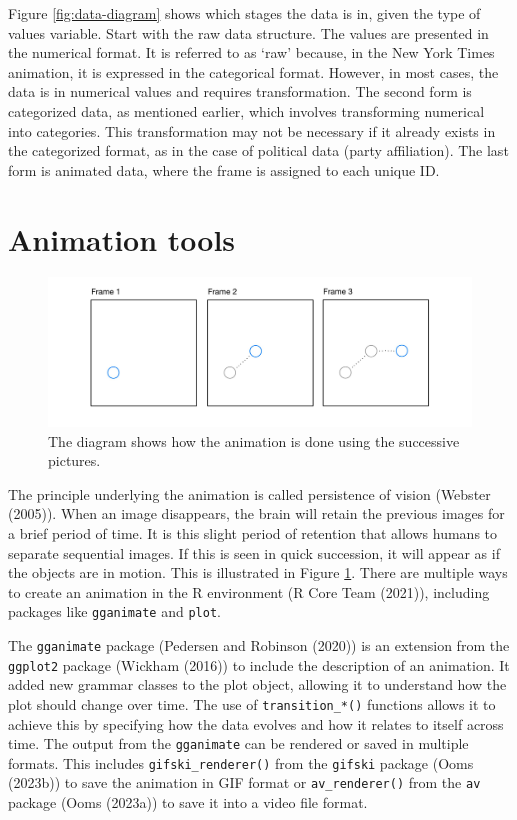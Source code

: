 Figure \ref{fig:data-diagram} shows which stages the data is in, given the type of values variable. Start with the raw data structure. The values are presented in the numerical format. It is referred to as `raw' because, in the New York Times animation, it is expressed in the categorical format. However, in most cases, the data is in numerical values and requires transformation. The second form is categorized data, as mentioned earlier, which involves transforming numerical into categories.
This transformation may not be necessary if it already exists in the categorized format, as in the case of political data (party affiliation). The last form is animated data, where the frame is assigned to each unique ID.

\hypertarget{animation-tools}{%
\section{Animation tools}\label{animation-tools}}

\begin{figure}

{\centering \includegraphics[width=1\linewidth]{figures/animation-diagram} 

}

\caption{The diagram shows how the animation is done using the successive pictures.}\label{fig:animation-diagram}
\end{figure}

The principle underlying the animation is called persistence of vision (Webster (2005)). When an image disappears, the brain will retain the previous images for a brief period of time. It is this slight period of retention that allows humans to separate sequential images. If this is seen in quick succession, it will appear as if the objects are in motion. This is illustrated in Figure \ref{fig:animation-diagram}. There are multiple ways to create an animation in the R environment (R Core Team (2021)), including packages like \texttt{gganimate} and \texttt{plot}.

The \texttt{gganimate} package (Pedersen and Robinson (2020)) is an extension from the \texttt{ggplot2} package (Wickham (2016)) to include the description of an animation. It added new grammar classes to the plot object, allowing it to understand how the plot should change over time. The use of \texttt{transition\_*()} functions allows it to achieve this by specifying how the data evolves and how it relates to itself across time. The output from the \texttt{gganimate} can be rendered or saved in multiple formats. This includes \texttt{gifski\_renderer()} from the \texttt{gifski} package (Ooms (2023b)) to save the animation in GIF format or \texttt{av\_renderer()} from the \texttt{av} package (Ooms (2023a)) to save it into a video file format.


